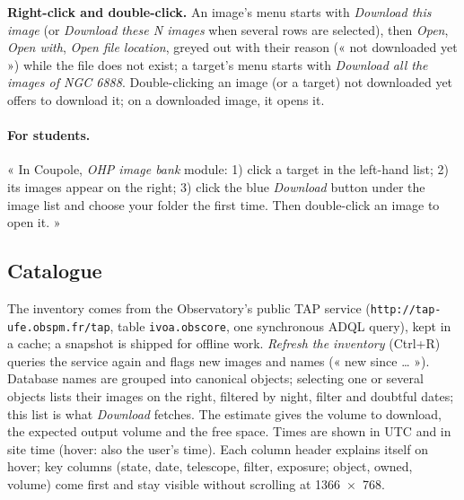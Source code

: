 \textbf{Right-click and double-click.} An image's menu starts with \emph{Download this image} (or \emph{Download
these N images} when several rows are selected), then \emph{Open}, \emph{Open with}, \emph{Open file location},
greyed out with their reason (« not downloaded yet ») while the file does not exist; a target's menu starts with
\emph{Download all the images of NGC 6888}. Double-clicking an image (or a target) not downloaded yet offers to
download it; on a downloaded image, it opens it.

\paragraph{For students.} « In Coupole, \emph{OHP image bank} module: 1) click a target in the left-hand list;
2) its images appear on the right; 3) click the blue \emph{Download} button under the image list and choose your
folder the first time. Then double-click an image to open it. »

\subsection{Catalogue}
The inventory comes from the Observatory's public TAP service (\texttt{http://tap-ufe.obspm.fr/tap}, table
\texttt{ivoa.obscore}, one synchronous ADQL query), kept in a cache; a snapshot is shipped for offline work.
\emph{Refresh the inventory} (Ctrl+R) queries the service again and flags new images and names (« new since … »).
Database names are grouped into canonical objects; selecting one or several objects lists their images on the
right, filtered by night, filter and doubtful dates; this list is what \emph{Download} fetches. The estimate gives the
volume to download, the expected output volume and the free space. Times are shown in UTC and in site time (hover:
also the user's time). Each column header explains itself on hover; key columns (state, date, telescope, filter,
exposure; object, owned, volume) come first and stay visible without scrolling at 1366~×~768.

